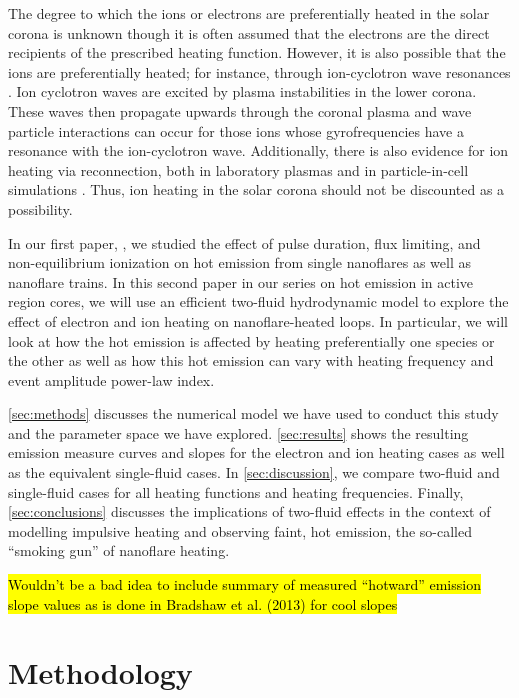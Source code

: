 \documentclass[tighten,apj]{emulateapj}
\begin{document}
	\par The degree to which the ions or electrons are preferentially heated in the solar corona is unknown though it is often assumed that the electrons are the direct recipients of the prescribed heating function. However, it is also possible that the ions are preferentially heated; for instance, through ion-cyclotron wave resonances \citep{markovskii_intermittent_2004}. Ion cyclotron waves are excited by plasma instabilities in the lower corona. These waves then propagate upwards through the coronal plasma and wave particle interactions can occur for those ions whose gyrofrequencies have a resonance with the ion-cyclotron wave. Additionally, there is also evidence for ion heating via reconnection, both in laboratory plasmas and in particle-in-cell simulations \citep{ono_ion_1996,yoo_bulk_2014,drake_onset_2014}. Thus, ion heating in the solar corona should not be discounted as a possibility.
	\par In our first paper, \citet{cargill_hot_2016}, we studied the effect of pulse duration, flux limiting, and non-equilibrium ionization on hot emission from single nanoflares as well as nanoflare trains. In this second paper in our series on hot emission in active region cores, we will use an efficient two-fluid hydrodynamic model to explore the effect of electron and ion heating on nanoflare-heated loops. In particular, we will look at how the hot emission is affected by heating preferentially one species or the other as well as how this hot emission can vary with heating frequency and event amplitude power-law index. 
	\par\autoref{sec:methods} discusses the numerical model we have used to conduct this study and the parameter space we have explored. \autoref{sec:results} shows the resulting emission measure curves and slopes for the electron and ion heating cases as well as the equivalent single-fluid cases. In \autoref{sec:discussion}, we compare two-fluid and single-fluid cases for all heating functions and heating frequencies. Finally, \autoref{sec:conclusions} discusses the implications of two-fluid effects in the context of modelling impulsive heating and observing faint, hot emission, the so-called ``smoking gun'' of nanoflare heating.
	\par\hl{Wouldn't be a bad idea to include summary of measured ``hotward'' emission slope values as is done in Bradshaw et al. (2013) for cool slopes}
	\section{Methodology}
	\label{sec:methods}
\end{document}
